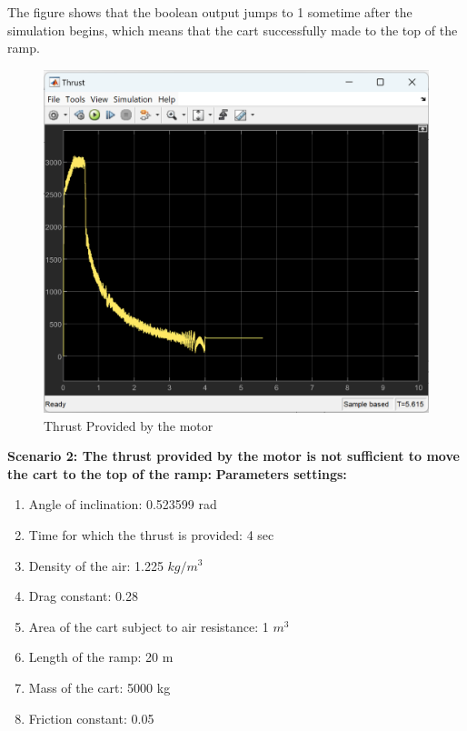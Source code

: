 \documentclass{article}
\begin{document}
    The figure shows that the boolean output jumps to 1 sometime after the
    simulation begins, which means that the cart successfully made to the top of
    the ramp.
    \newline
    \begin{figure}[H]
        \centering
        \includegraphics[width=0.8\linewidth]{thrust_1.png}
        \caption{Thrust Provided by the motor}
        \label{fig:thrust}
    \end{figure}
    \textbf{Scenario 2: The thrust provided by the motor is not sufficient to move
    the cart to the top of the ramp: }
    \newline
    \newline
    \textbf{Parameters settings:}
    \newline
    \begin{enumerate}
        \item Angle of inclination: 0.523599 rad

        \item Time for which the thrust is provided: 4 sec

        \item Density of the air: 1.225 $kg/m^{3}$

        \item Drag constant: 0.28

        \item Area of the cart subject to air resistance: 1 $m^{3}$

        \item Length of the ramp: 20 m

        \item Mass of the cart: 5000 kg

        \item Friction constant: 0.05
    \end{enumerate}
\end{document}

